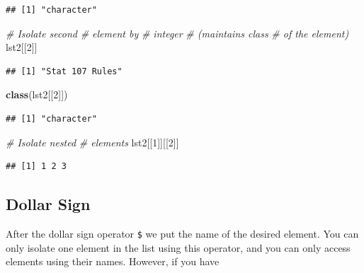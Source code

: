 \documentclass[
]{book}
\newenvironment{Shaded}{\begin{snugshade}}{\end{snugshade}}
\newcommand{\CommentTok}[1]{\textcolor[rgb]{0.56,0.35,0.01}{\textit{#1}}}
\newcommand{\DecValTok}[1]{\textcolor[rgb]{0.00,0.00,0.81}{#1}}
\newcommand{\KeywordTok}[1]{\textcolor[rgb]{0.13,0.29,0.53}{\textbf{#1}}}
\newcommand{\NormalTok}[1]{#1}
\newcommand{\OperatorTok}[1]{\textcolor[rgb]{0.81,0.36,0.00}{\textbf{#1}}}
\begin{document}
\begin{verbatim}
## [1] "character"
\end{verbatim}

\begin{Shaded}
\begin{Highlighting}[]
\CommentTok{# Isolate second}
\CommentTok{# element by}
\CommentTok{# integer}
\CommentTok{# (maintains class}
\CommentTok{# of the element)}
\NormalTok{lst2[[}\DecValTok{2}\NormalTok{]]}
\end{Highlighting}
\end{Shaded}

\begin{verbatim}
## [1] "Stat 107 Rules"
\end{verbatim}

\begin{Shaded}
\begin{Highlighting}[]
\KeywordTok{class}\NormalTok{(lst2[[}\DecValTok{2}\NormalTok{]])}
\end{Highlighting}
\end{Shaded}

\begin{verbatim}
## [1] "character"
\end{verbatim}

\begin{Shaded}
\begin{Highlighting}[]
\CommentTok{# Isolate nested}
\CommentTok{# elements}
\NormalTok{lst2[[}\DecValTok{1}\NormalTok{]][[}\DecValTok{2}\NormalTok{]]}
\end{Highlighting}
\end{Shaded}

\begin{verbatim}
## [1] 1 2 3
\end{verbatim}

\hypertarget{dollar-sign}{%
\subsection{Dollar Sign}\label{dollar-sign}}

After the dollar sign operator \texttt{\$} we put the name of the desired element. You can only isolate one element in the list using this operator, and you can only access elements using their names. However, if you have

\begin{Shaded}
\end{Shaded}
\end{document}
